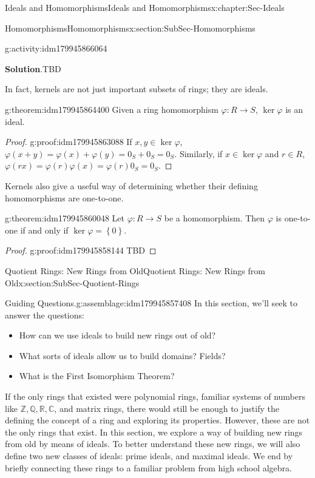 \documentclass[oneside,10pt,]{book}
\newcommand{\blocktitlefont}{\relax}
\numberwithin{equation}{section}
\def\p{\varphi}
\newcommand{\set}[1]{\left\{ {#1} \right\}}
\def\C{{\mathbb C}}
\def\Z{{\mathbb Z}}
\def\Q{{\mathbb Q}}
\def\R{{\mathbb R}}
\begin{document}
\begin{chapterptx}{Ideals and Homomorphisms}{}{Ideals and Homomorphisms}{}{}{x:chapter:Sec-Ideals}
\begin{sectionptx}{Homomorphisms}{}{Homomorphisms}{}{}{x:section:SubSec-Homomorphisms}
\begin{activity}{}{g:activity:idm179945866064}
\par\smallskip%
\noindent\textbf{\blocktitlefont Solution}.\hypertarget{g:solution:idm179945865008}{}\quad{}TBD\end{activity}
In fact, kernels are not just important subsets of rings; they are ideals.%
\begin{theorem}{}{}{g:theorem:idm179945864400}%
Given a ring homomorphism \(\p : R\to S\), \(\ker\p\) is an ideal.%
\end{theorem}
\begin{proof}{}{g:proof:idm179945863088}
If \(x,y\in \ker\p\), \(\p(x+y) = \p(x) + \p(y) = 0_S + 0_S = 0_S\). Similarly, if \(x\in \ker \p\) and \(r\in R\), \(\p(rx) = \p(r) \p(x) = \p(r) 0_S = 0_S\).%
\end{proof}
Kernels also give a useful way of determining whether their defining homomorphisms are one-to-one.%
\begin{theorem}{}{}{g:theorem:idm179945860048}%
Let \(\p : R\to S\) be a homomorphism. Then \(\p\) is one-to-one if and only if \(\ker\p = \set{0}\).%
\end{theorem}
\begin{proof}{}{g:proof:idm179945858144}
TBD\end{proof}
\end{sectionptx}
%
%
\typeout{************************************************}
\typeout{************************************************}
%
\begin{sectionptx}{Quotient Rings: New Rings from Old}{}{Quotient Rings: New Rings from Old}{}{}{x:section:SubSec-Quotient-Rings}
\begin{assemblage}{Guiding Questions.}{g:assemblage:idm179945857408}%
In this section, we'll seek to answer the questions: %
\begin{itemize}[label=\textbullet]
\item{}How can we use ideals to build new rings out of old?%
\item{}What sorts of ideals allow us to build domains? Fields?%
\item{}What is the First Isomorphism Theorem?%
\end{itemize}
%
\end{assemblage}
\begin{introduction}{}%
If the only rings that existed were polynomial rings, familiar systems of numbers like \(\Z, \Q, \R, \C\), and matrix rings, there would still be enough to justify the defining the concept of a ring and exploring its properties. However, these are not the only rings that exist. In this section, we explore a way of building new rings from old by means of ideals. To better understand these new rings, we will also define two new classes of ideals: prime ideals, and maximal ideals. We end by briefly connecting these rings to a familiar problem from high school algebra.%

\end{introduction}
\end{sectionptx}
\end{chapterptx}
\end{document}
